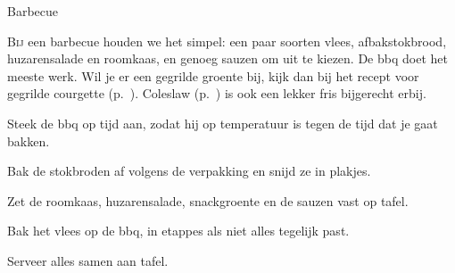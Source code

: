 \begin{recipe}{Barbecue}


\lettrine{B}{ij} een barbecue houden we het simpel: een paar soorten vlees,
afbakstokbrood, huzarensalade en roomkaas, en genoeg sauzen om uit te
kiezen. De bbq doet het meeste werk. Wil je er een gegrilde groente bij,
kijk dan bij het recept voor gegrilde courgette
(p.~\pageref{recipe:gegrilde-courgette}). Coleslaw
(p.~\pageref{recipe:coleslaw}) is ook een lekker fris bijgerecht erbij.

\begin{ingredients}
\end{ingredients}

\begin{steps}
  \item Steek de bbq op tijd aan, zodat hij op temperatuur is tegen de tijd
        dat je gaat bakken.
  \item Bak de stokbroden af volgens de verpakking en snijd ze in plakjes.
  \item Zet de roomkaas, huzarensalade, snackgroente en de sauzen vast op
        tafel.
  \item Bak het vlees op de bbq, in etappes als niet alles tegelijk past.
  \item Serveer alles samen aan tafel.
\end{steps}
\end{recipe}

